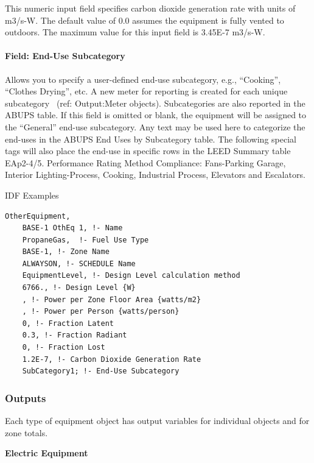 This numeric input field specifies carbon dioxide generation rate with units of m3/s-W. The default value of 0.0 assumes the equipment is fully vented to outdoors. The maximum value for this input field is 3.45E-7 m3/s-W.

\paragraph{Field: End-Use Subcategory}\label{field-end-use-subcategory-otherequip}

Allows you to specify a user-defined end-use subcategory, e.g., ``Cooking'', ``Clothes Drying'', etc. A new meter for reporting is created for each unique subcategory~ (ref: Output:Meter objects). Subcategories are also reported in the ABUPS table. If this field is omitted or blank, the equipment will be assigned to the ``General'' end-use subcategory. Any text may be used here to categorize the end-uses in the ABUPS End Uses by Subcategory table. The following special tags will also place the end-use in specific rows in the LEED Summary table EAp2-4/5. Performance Rating Method Compliance:  Fans-Parking Garage, Interior Lighting-Process, Cooking, Industrial Process, Elevators and Escalators.


IDF Examples

\begin{lstlisting}
OtherEquipment,
	BASE-1 OthEq 1, !- Name
	PropaneGas,  !- Fuel Use Type
	BASE-1, !- Zone Name 
	ALWAYSON, !- SCHEDULE Name
	EquipmentLevel, !- Design Level calculation method
	6766., !- Design Level {W}
	, !- Power per Zone Floor Area {watts/m2}
	, !- Power per Person {watts/person}
	0, !- Fraction Latent
	0.3, !- Fraction Radiant
	0, !- Fraction Lost
	1.2E-7, !- Carbon Dioxide Generation Rate
	SubCategory1; !- End-Use Subcategory
\end{lstlisting}

\subsubsection{Outputs}\label{outputs-5-004}

Each type of equipment object has output variables for individual objects and for zone totals.

\textbf{Electric Equipment}

